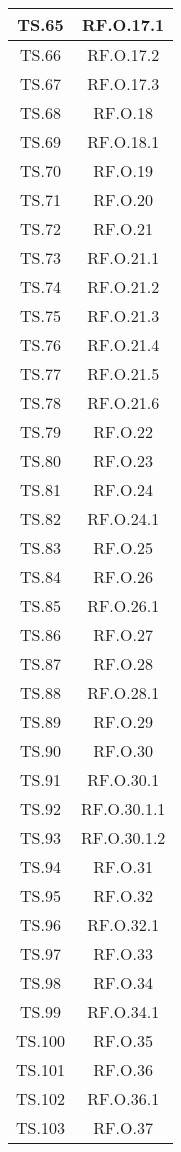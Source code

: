 {{{{{{{{{\begin{xltabular}{\textwidth}{|c|c|}
\hline
TS.65 & RF.O.17.1 \\
\hline
TS.66 & RF.O.17.2 \\
\hline
TS.67 & RF.O.17.3 \\
\hline
TS.68 & RF.O.18 \\
\hline
TS.69 & RF.O.18.1 \\
\hline
TS.70 & RF.O.19 \\
\hline
TS.71 & RF.O.20 \\
\hline
TS.72 & RF.O.21 \\
\hline
TS.73 & RF.O.21.1 \\
\hline
TS.74 & RF.O.21.2 \\
\hline
TS.75 & RF.O.21.3 \\
\hline
TS.76 & RF.O.21.4 \\
\hline
TS.77 & RF.O.21.5 \\
\hline
TS.78 & RF.O.21.6 \\
\hline
TS.79 & RF.O.22 \\
\hline
TS.80 & RF.O.23 \\
\hline
TS.81 & RF.O.24 \\
\hline
TS.82 & RF.O.24.1 \\
\hline
TS.83 & RF.O.25 \\
\hline
TS.84 & RF.O.26 \\
\hline
TS.85 & RF.O.26.1 \\
\hline
TS.86 & RF.O.27 \\
\hline
TS.87 & RF.O.28 \\
\hline
TS.88 & RF.O.28.1 \\
\hline
TS.89 & RF.O.29 \\
\hline
TS.90 & RF.O.30 \\
\hline
TS.91 & RF.O.30.1 \\
\hline
TS.92 & RF.O.30.1.1 \\
\hline
TS.93 & RF.O.30.1.2 \\
\hline
TS.94 & RF.O.31 \\
\hline
TS.95 & RF.O.32 \\
\hline
TS.96 & RF.O.32.1 \\
\hline
TS.97 & RF.O.33 \\
\hline
TS.98 & RF.O.34 \\
\hline
TS.99 & RF.O.34.1 \\
\hline
TS.100 & RF.O.35 \\
\hline
TS.101 & RF.O.36 \\
\hline
TS.102 & RF.O.36.1 \\
\hline
TS.103 & RF.O.37 \\

\end{xltabular}}}}}}}}}}
